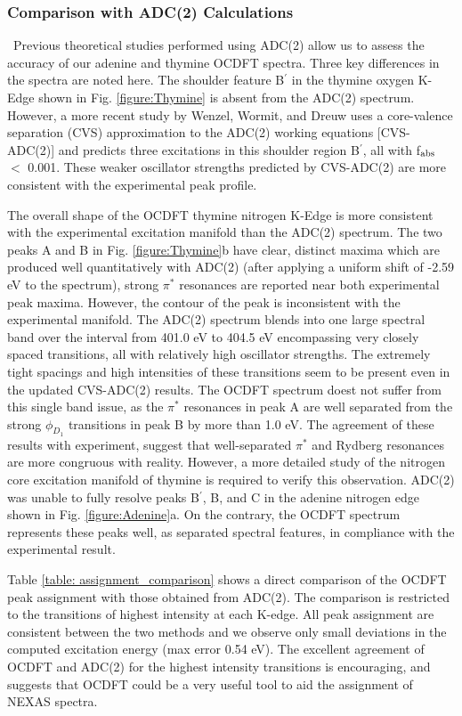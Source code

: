 \documentclass[8.5pt,twoside,twocolumn]{article}
\begin{document}
\subsubsection{Comparison with ADC(2) Calculations} \
Previous theoretical studies performed using ADC(2) allow us to assess the accuracy of our adenine and thymine OCDFT spectra. Three key differences in the spectra are noted here. 
The shoulder feature B$^{\prime}$ in the thymine oxygen K-Edge shown in Fig. \ref{figure:Thymine} is absent from the ADC(2) spectrum.\cite{plekan_theoretical_2008} However, a more recent study by Wenzel, Wormit, and Dreuw \cite{wenzel_calculating_2014} uses a core-valence separation (CVS) approximation to the ADC(2) working equations [CVS-ADC(2)] and predicts three excitations in this shoulder region B$^{\prime}$, all with f$_{\rm abs}$ $<$ 0.001. These weaker oscillator strengths predicted by CVS-ADC(2) are more consistent with the experimental peak profile.

The overall shape of the OCDFT thymine nitrogen K-Edge is more consistent with the experimental excitation manifold than the ADC(2) spectrum. The two peaks A and B in Fig. \ref{figure:Thymine}b have clear, distinct maxima which are produced well quantitatively with ADC(2) (after applying a uniform shift of -2.59 eV to the spectrum), strong $\pi^*$ resonances are reported near both experimental peak maxima. However, the contour of the peak is inconsistent with the experimental manifold. The ADC(2) spectrum blends into one large spectral band over the interval from 401.0 eV to 404.5 eV encompassing very closely spaced transitions, all with relatively high oscillator strengths. The extremely tight spacings and high intensities of these transitions seem to be present even in the updated CVS-ADC(2) results. The OCDFT spectrum doest not suffer from this single band issue, as the $\pi^*$ resonances in peak A are well separated from the strong $\phi_{D_1}$ transitions in peak B by more than 1.0 eV. The agreement of these results with experiment, suggest that well-separated $\pi^*$ and Rydberg resonances are more congruous with reality. However, a more detailed study of the nitrogen core excitation manifold of thymine is required to verify this observation.
ADC(2) was unable to fully resolve peaks B$^{\prime}$, B, and C in the adenine nitrogen edge shown in Fig. \ref{figure:Adenine}a. On the contrary, the OCDFT spectrum represents these peaks well, as separated spectral features, in compliance with the experimental result. 

Table \ref{table: assignment_comparison} shows a direct comparison of the OCDFT peak assignment with those obtained from ADC(2).
The comparison is restricted to the transitions of highest intensity at each K-edge. All peak assignment are consistent between the two methods and we observe only small deviations in the computed excitation energy (max error 0.54 eV).
The excellent agreement of OCDFT and ADC(2) for the highest intensity transitions is encouraging, and suggests that OCDFT could be a very useful tool to aid the assignment of NEXAS spectra.
\end{document}
